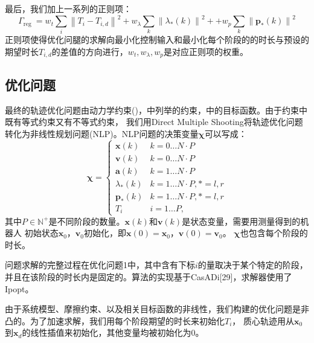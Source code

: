 最后，我们加上一系列的正则项：
\begin{equation}
    \label{equ:cost_4}
    \Gamma_{\text {reg }}=  w_t \sum_i\left\|T_i-T_{i, d}\right\|^2+w_\lambda \sum_k\left\|\lambda_*(k)\right\|^2+ 
        +w_p \sum_k\left\|\boldsymbol{p}_*(k)\right\|^2
\end{equation}
正则项使得优化问腿的求解向最小化控制输入和最小化每个阶段的的时长与预设的期望时长$T_{i, d}$的差值的方向进行，$w_t, w_\lambda, w_p$是对应正则项的权重。

\subsection{优化问题}
最终的轨迹优化问题由动力学约束()，中列举的约束，中的目标函数。由于约束中既有等式约束又有不等式约束，
我们用Direct Multiple Shooting将轨迹优化问题转化为非线性规划问题(NLP)。NLP问题的决策变量$\boldsymbol{\chi}$可以写成：
\begin{equation}
    \label{equ:decision_variable}
    \boldsymbol{\chi} = \begin{cases}\boldsymbol{x}(k) & k=0 \ldots N \cdot P \\ \boldsymbol{v}(k) & k=0 \ldots N \cdot P \\ \boldsymbol{a}(k) & k=1 \ldots N \cdot P \\ \lambda_*(k) & k=1 \ldots N \cdot P, *=l, r \\ \boldsymbol{p}_*(k) & k=1 \ldots N \cdot P, *=l, r \\ T_i & i=1 \ldots P,\end{cases}
\end{equation}
其中$P \in \mathbb{N}^+$是不同阶段的数量。$\boldsymbol{x}(k)$和$\boldsymbol{v}(k)$是状态变量，需要用测量得到的机器人
初始状态$\boldsymbol{x}_0$，$\boldsymbol{v}_0$初始化，即$\boldsymbol{x}(0)=\boldsymbol{x}_0$，$\boldsymbol{v}(0)=\boldsymbol{v}_0$。
$\boldsymbol{\chi}$也包含每个阶段的时长。

问题求解的完整过程在优化问题1中，其中含有下标$i$的量取决于某个特定的阶段，并且在该阶段的时长内是固定的。算法的实现基于CasADi[29]，求解器使用了Ipopt。

由于系统模型、摩擦约束、以及相关目标函数的非线性，我们构建的优化问题是非凸的。为了加速求解，我们用每个阶段期望的时长来初始化$T_i$，
质心轨迹用从$\boldsymbol{x}_0$到$\boldsymbol{x}_d$的线性插值来初始化，其他变量均被初始化为0。


